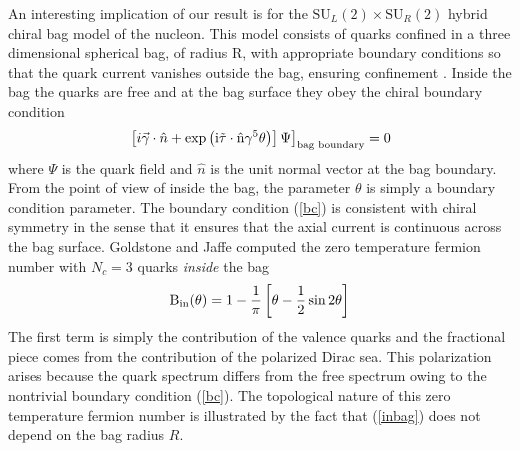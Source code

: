 \documentclass[a4paper,prd,showpacs,showkeys]{revtex4}
\begin{document}
{{An interesting implication of our result is for the $\textrm{SU}_L (2) \times \textrm{SU}_R (2)$ hybrid chiral bag model of the nucleon. This model consists of quarks confined in a three dimensional spherical bag, of radius R, with appropriate boundary conditions so that the quark current vanishes outside the bag, ensuring confinement \cite{jaffe,bhaduri}. Inside the bag the quarks are free and at the bag surface they obey the chiral boundary condition
\begin{equation}
\left. \left[i \vec{\gamma} \cdot \hat{n} + \rm{exp}\left(i \vec{\tau}\cdot \hat{n} \gamma^{5} \theta \right)\right] \Psi\right]_{\rm bag\,\, boundary}=0
\label{bc}
\end{equation}
where $\Psi$ is the quark field and $\hat{n}$ is the unit normal vector at the bag boundary. From the point of view of inside the bag, the parameter $\theta$ is simply a boundary condition parameter. The boundary condition (\ref{bc})  is consistent with chiral symmetry in the sense that it ensures that the axial current is continuous across the bag surface. Goldstone and Jaffe computed the zero temperature fermion  number with $N_c =3$ quarks {\it inside} the bag \cite{jaffe}
\begin{equation}
\textrm{B}_{\rm{in}}(\theta)=1- \frac{1}{\pi}\left[ \theta-\frac{1}{2} \sin 2 \theta\right]
\label{inbag}
\end{equation}
The first term is simply the contribution of the valence quarks and the fractional piece comes from the contribution of the polarized Dirac sea. This polarization arises because the quark spectrum differs from the free spectrum owing to the nontrivial boundary condition (\ref{bc}). The topological nature of this zero temperature fermion number is illustrated by the fact that (\ref{inbag}) does not depend on the bag radius $R$.

}}
\end{document}
